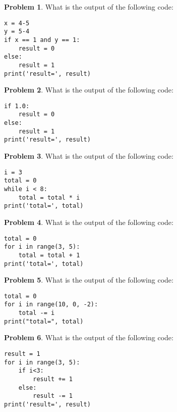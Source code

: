 \documentclass[10pt]{article}
\theoremstyle{definition}
\newtheorem{problem}{Problem}
\begin{document}
\newpage
\begin{problem}
    What is the output of the following code:
\end{problem}
\begin{lstlisting}
x = 4-5
y = 5-4
if x == 1 and y == 1:
    result = 0
else:
    result = 1
print('result=', result)
\end{lstlisting}
\vspace{1.8in}


\begin{problem}
    What is the output of the following code:
\end{problem}
\begin{lstlisting}
if 1.0:
    result = 0
else:
    result = 1
print('result=', result)
\end{lstlisting}
\vspace{1.8in}


\begin{problem}
    What is the output of the following code:
\end{problem}
\begin{lstlisting}
i = 3
total = 0
while i < 8:
    total = total * i
print('total=', total)
\end{lstlisting}
\vspace{1.8in}


\begin{problem}
    What is the output of the following code:
\end{problem}
\begin{lstlisting}
total = 0
for i in range(3, 5):
    total = total + 1
print('total=', total)
\end{lstlisting}
\vspace{2in}


\begin{problem}
    What is the output of the following code:
\end{problem}
\begin{lstlisting}
total = 0
for i in range(10, 0, -2):
    total -= i
print("total=", total)
\end{lstlisting}
\vspace{2in}


\begin{problem}
    What is the output of the following code:
\end{problem}
\begin{lstlisting}
result = 1
for i in range(3, 5):
    if i<3:
        result += 1
    else:
        result -= 1
print('result=', result)
\end{lstlisting}
\vspace{2in}
\end{document}
